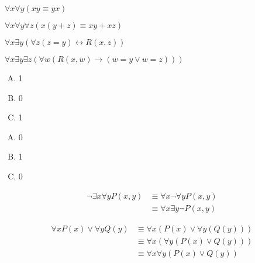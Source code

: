 {{        %
        \begin{practices}
            $\forall x \forall y (xy \equiv yx)$
        \end{practices}

        \begin{practices}
            $\forall x \forall y \forall z (x(y + z) \equiv xy + xz)$
        \end{practices}

        \begin{practices}
            $\forall x \exists y (\forall z (z = y) \leftrightarrow R(x, z))$
        \end{practices}

        \begin{practices}
            $\forall x \exists y \exists z (\forall w (R(x, w) \rightarrow (w = y \vee w = z)))$
        \end{practices}

        \begin{practices}
            \begin{enumerate}[A.]
                \item 1
                \item 0
                \item 1
            \end{enumerate}
        \end{practices}

        \begin{practices}
            \begin{enumerate}[A.]
                \item 0
                \item 1
                \item 0
            \end{enumerate}
        \end{practices}

        \begin{practices}
            \begin{align*}
                \neg \exists x \forall y P(x, y)
                &\equiv \forall x \neg \forall y P(x, y) \\
                &\equiv \forall x \exists y \neg P(x, y)
            \end{align*}
        \end{practices}

        \begin{practices}
            \begin{align*}
                \forall x P(x) \vee \forall y Q(y)
                &\equiv \forall x (P(x) \vee \forall y (Q(y))) \\
                &\equiv \forall x (\forall y (P(x) \vee Q(y))) \\
                &\equiv \forall x \forall y (P(x) \vee Q(y))
            \end{align*}
        \end{practices}

}}
